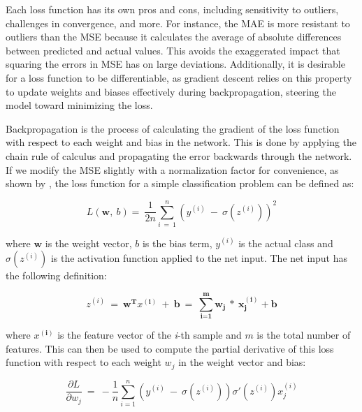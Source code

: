 \documentclass[12pt,a4paper]{article}
\begin{document}
Each loss function has its own pros and cons, including sensitivity to outliers, challenges in convergence, and more. For instance, the MAE is more resistant to outliers than the MSE because it calculates the average of absolute differences between predicted and actual values. This avoids the exaggerated impact that squaring the errors in MSE has on large deviations. Additionally, it is desirable for a loss function to be differentiable, as gradient descent relies on this property to update weights and biases effectively during backpropagation, steering the model toward minimizing the loss.

Backpropagation is the process of calculating the gradient of the loss function with respect to each weight and bias in the network. This is done by applying the chain rule of calculus and propagating the error backwards through the network. If we modify the MSE slightly with a normalization factor for convenience, as shown by \cite{Raschka2017}, the loss function for a simple classification problem can be defined as: 

\begin{equation}
  L\left(\textbf{w},\ b\right)=\ \frac{1}{2n}\sum_{i\ =\ 1}^{n}\left(y^{\left(i\right)}\ -\ \sigma\left(z^{\left(i\right)}\right)\right)^2
  \label{simplifiedloss}
\end{equation}

where $\textbf{w}$ is the weight vector, $b$ is the bias term, $y^{\left(i\right)}$ is the actual class and $\sigma\left(z^{\left(i\right)}\right)$ is the activation function applied to the net input. The net input has the following definition:

\begin{equation}
  z^{(i)}\ =\ \textbf{w}^\textbf{T}x^{(\textbf{i})}\ +\ \textbf{b}\ =\ \sum_{\textbf{i}=\textbf{1}}^{\textbf{m}}{\textbf{w}_\textbf{j}\ \ast\ \textbf{x}_\textbf{j}^{(\textbf{i})}+\textbf{b}}
\end{equation}

where $x^{(\textbf{i})}$ is the feature vector of the \textit{i}-th sample and $m$ is the total number of features. This can then be used to compute the partial derivative of this loss function with respect to each weight $w_j$ in the weight vector and bias:

\begin{equation}
  \frac{\partial L}{\partial w_j}\ =\ -\frac{1}{n}\sum_{i=1}^{n}\left(y^{\left(i\right)}\ -\ \sigma\left(z^{\left(i\right)}\right)\right)\sigma'\left(z^{\left(i\right)}\right)x_j^{\left(i\right)}
\end{equation}
\end{document}
